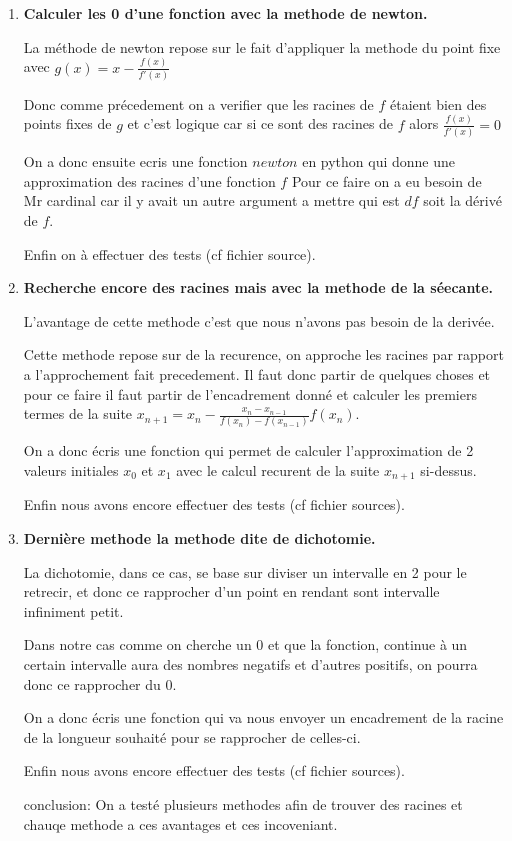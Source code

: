 \documentclass{article}
\begin{document}
\begin{enumerate}
\item{\bf Calculer les 0 d'une fonction avec la methode de newton.}

La méthode de newton repose sur le fait d'appliquer la methode du point fixe avec $g(x)=x-\frac{f(x)}{f'(x)}$

Donc comme précedement on a verifier que les racines de $f$ étaient bien des points fixes de $g$ et c'est logique car si ce sont des racines de $f$ alors $\frac{f(x)}{f'(x)}=0$

On a donc ensuite ecris une fonction $newton$ en python qui donne une approximation des racines d'une fonction $f$
Pour ce faire on a eu besoin de Mr cardinal car il y avait un autre argument a mettre qui est $df$ soit la dérivé de $f$.

Enfin on à effectuer des tests (cf fichier source).\newline

\item{\bf Recherche encore des racines mais avec la methode de la séecante.}

L'avantage de cette methode c'est que nous n'avons pas besoin de la derivée.



Cette methode repose sur de la recurence, on approche les racines par rapport a l'approchement fait precedement. Il faut donc partir de quelques choses et pour ce faire il faut partir de l'encadrement donné et calculer les premiers termes de la suite $x_{n+1}=x_n-\frac{x_n-x_{n-1}}{f(x_n)-f(x_{n-1})}f(x_n)$.

On a donc écris une fonction qui permet de calculer l'approximation de 2 valeurs initiales $x_0$ et $x_1$ avec le calcul recurent de la suite $x_{n+1}$ si-dessus.

Enfin nous avons encore effectuer des tests (cf fichier sources).\newline

\item{\bf Dernière methode la methode dite de dichotomie.}

La dichotomie, dans ce cas, se base sur diviser un intervalle en 2 pour le retrecir, et donc ce rapprocher d'un point en rendant sont intervalle infiniment petit.

Dans notre cas comme on cherche un 0 et que la fonction, continue à un certain intervalle aura des nombres negatifs et d'autres positifs, on pourra donc ce rapprocher du 0.

On a donc écris une fonction qui va nous envoyer un encadrement de la racine de la longueur souhaité pour se rapprocher de celles-ci.


Enfin nous avons encore effectuer des tests (cf fichier sources).\newline\newline

conclusion: On a testé plusieurs methodes afin de trouver des racines et chauqe methode a ces avantages et ces incoveniant.





\end{enumerate}
\end{document}
